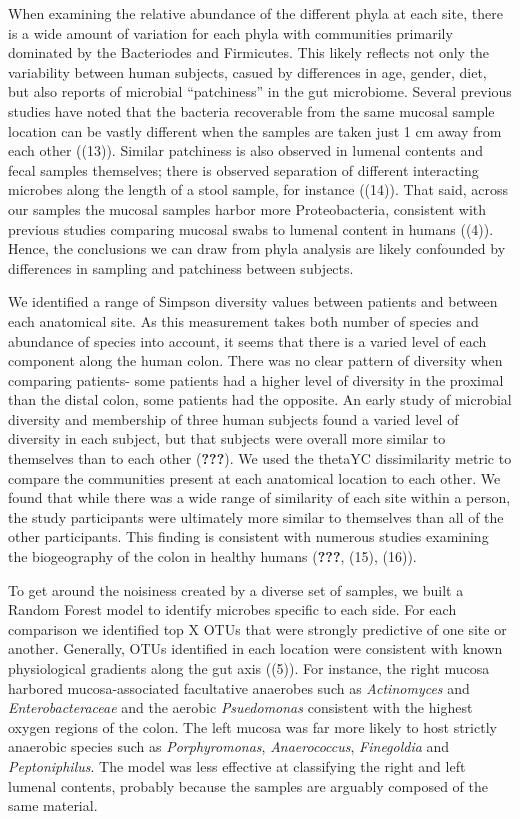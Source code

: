 \documentclass[11pt,]{article}
\begin{document}
When examining the relative abundance of the different phyla at each
site, there is a wide amount of variation for each phyla with
communities primarily dominated by the Bacteriodes and Firmicutes. This
likely reflects not only the variability between human subjects, casued
by differences in age, gender, diet, but also reports of microbial
``patchiness'' in the gut microbiome. Several previous studies have
noted that the bacteria recoverable from the same mucosal sample
location can be vastly different when the samples are taken just 1 cm
away from each other ((13)). Similar patchiness is also observed in
lumenal contents and fecal samples themselves; there is observed
separation of different interacting microbes along the length of a stool
sample, for instance ((14)). That said, across our samples the mucosal
samples harbor more Proteobacteria, consistent with previous studies
comparing mucosal swabs to lumenal content in humans ((4)). Hence, the
conclusions we can draw from phyla analysis are likely confounded by
differences in sampling and patchiness between subjects.

We identified a range of Simpson diversity values between patients and
between each anatomical site. As this measurement takes both number of
species and abundance of species into account, it seems that there is a
varied level of each component along the human colon. There was no clear
pattern of diversity when comparing patients- some patients had a higher
level of diversity in the proximal than the distal colon, some patients
had the opposite. An early study of microbial diversity and membership
of three human subjects found a varied level of diversity in each
subject, but that subjects were overall more similar to themselves than
to each other (\textbf{???}). We used the thetaYC dissimilarity metric
to compare the communities present at each anatomical location to each
other. We found that while there was a wide range of similarity of each
site within a person, the study participants were ultimately more
similar to themselves than all of the other participants. This finding
is consistent with numerous studies examining the biogeography of the
colon in healthy humans (\textbf{???}, (15), (16)).

To get around the noisiness created by a diverse set of samples, we
built a Random Forest model to identify microbes specific to each side.
For each comparison we identified top X OTUs that were strongly
predictive of one site or another. Generally, OTUs identified in each
location were consistent with known physiological gradients along the
gut axis ((5)). For instance, the right mucosa harbored
mucosa-associated facultative anaerobes such as \emph{Actinomyces} and
\emph{Enterobacteraceae} and the aerobic \emph{Psuedomonas} consistent
with the highest oxygen regions of the colon. The left mucosa was far
more likely to host strictly anaerobic species such as
\emph{Porphyromonas}, \emph{Anaerococcus}, \emph{Finegoldia} and
\emph{Peptoniphilus}. The model was less effective at classifying the
right and left lumenal contents, probably because the samples are
arguably composed of the same material.
\end{document}
